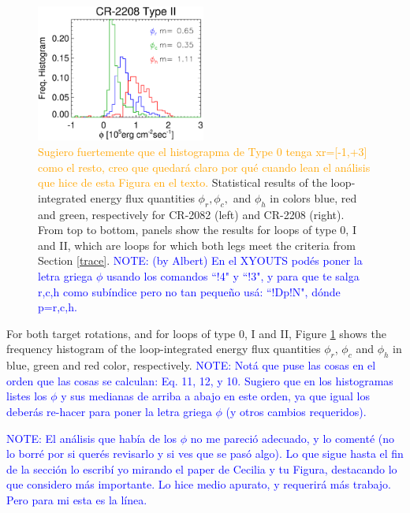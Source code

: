 \documentclass[namedreferences]{solarphysics}
\def\albert#1{\textcolor{orange}{#1}}
\def\notebyalbert#1{\textcolor{blue}{NOTE: #1}}
\begin{document}
\begin{article}
\begin{figure}[ht]
\begin{center}
\includegraphics[width=0.495\textwidth]{figs/histocr2208_cgenergia.eps}
\caption{\albert{Sugiero fuertemente que el histograpma de Type 0 tenga xr=[-1,+3] como el resto, creo que quedará claro por qué cuando lean el análisis que hice de esta Figura en el texto.} {Statistical results of the loop-integrated energy flux quantities $\phi_r,\phi_c,$ and $\phi_h$ in colors blue, red and green, respectively for CR-2082 (left) and CR-2208 (right). From top to bottom, panels show the results for loops of type 0, I and II, which are loops for which both legs meet the criteria from Section \ref{trace}.} \notebyalbert{(by Albert) En el XYOUTS podés poner la letra griega $\phi$ usando los comandos ``!4" y ``!3",  y para que te salga r,c,h como subíndice pero no tan pequeño usá: ``!Dp!N", dónde p=r,c,h.}}
\label{energia_demt}
\end{center}
\end{figure} 

For both target rotations, and for loops of type 0, I and II, Figure \ref{energia_demt} shows the frequency histogram of the loop-integrated energy flux quantities {$\phi_r$, $\phi_c$ and $\phi_h$ in blue, green and red color}, respectively. \notebyalbert{Notá que puse las cosas en el orden que las cosas se calculan: Eq. 11, 12, y 10. Sugiero que en los histogramas listes los $\phi$ y sus medianas de arriba a abajo en este orden, ya que igual los deberás re-hacer para poner la letra griega $\phi$ (y otros cambios requeridos).}

\notebyalbert{El análisis que había de los $\phi$ no me pareció adecuado, y lo comenté (no lo borré por si querés revisarlo y si ves que se pasó algo). Lo que sigue hasta el fin de la sección lo escribí yo mirando el paper de Cecilia y tu Figura, destacando lo que considero más importante. Lo hice medio apurato, y requerirá más trabajo. Pero para mi esta es la línea.}


\end{article}
\end{document}
